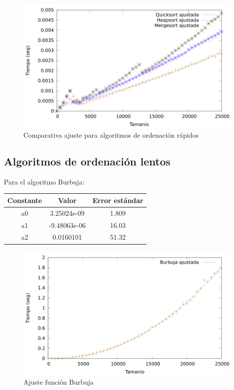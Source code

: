 \documentclass{article}
\begin{document}
	
	\begin{figure}[H]
		\centering
		\includegraphics[totalheight=8cm]{img/AlgOrdenacionRapidos_ajustados}
		\caption{Comparativa ajuste para algoritmos de ordenación rápidos}
		\label{fig:AlgOrdenacionRapidos_ajustados}
	\end{figure}

	\subsection{Algoritmos de ordenación lentos}


Para el algoritmo Burbuja:

	\begin{longtable}{|c|c|c|}
		\hline
		Constante		& Valor			& Error estándar	\\ \hline
		a0              & 3.25024e-09	& 1.809 \\ \hline
		a1              & -9.48063e-06	& 16.03 \\ \hline
		a2              & 0.0160101		& 51.32 \\ \hline
	\end{longtable}

	\begin{figure}[H]
		\centering
		\includegraphics[totalheight=8cm]{img/Burbuja_ajustada}
		\caption{Ajuste función Burbuja}
		\label{fig:Burbuja_ajustada}
	\end{figure}
\end{document}
